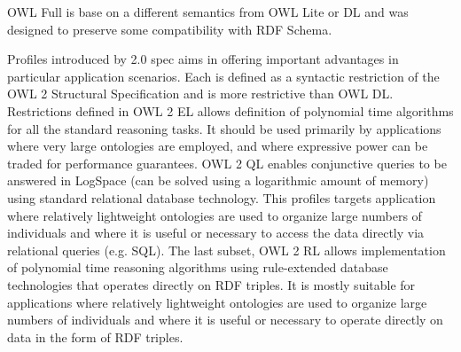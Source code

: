OWL Full is base on a different semantics from OWL Lite or DL and was designed to preserve some compatibility with RDF Schema. 

Profiles introduced by 2.0 spec aims in offering important advantages in particular application scenarios. Each is defined as a syntactic restriction of the OWL 2 Structural Specification and is more restrictive than OWL DL. Restrictions defined in OWL 2 EL allows definition of polynomial time algorithms for all the standard reasoning tasks. It should be used primarily by applications where very large ontologies are employed, and where expressive power can be traded for performance guarantees. OWL 2 QL enables conjunctive queries to be answered in LogSpace (can be solved using a logarithmic amount of memory) using standard relational database technology. This profiles targets application where relatively lightweight ontologies are used to organize large numbers of individuals and where it is useful or necessary to access  the data directly via relational queries (e.g.  SQL). The last subset, OWL 2 RL allows implementation of polynomial time reasoning algorithms using rule-extended database technologies that operates directly on RDF triples. It is mostly suitable for applications where relatively lightweight ontologies are used to organize large numbers of individuals and where it is useful or necessary to operate directly on data in the form of RDF triples.

